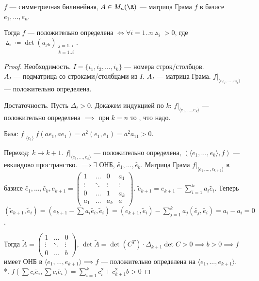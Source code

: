   \begin{theorem}
    $f$ --- симметричная билинейная,  $A \in M_n(\R)$ --- матрица Грама  $f$  в базисе $e_1, \ldots, e_n$.

    Тогда $f$ --- положительно определена  $\iff \forall i = 1..n \vartriangle_i > 0$, где $\vartriangle_i \coloneqq \det(a_{jk})_{\substack{j=1..i\\k=1..i}}$.
\end{theorem}
\begin{proof}
    Необходимость. $I = \{i_1, i_2, \ldots, i_k\}$ --- номера строк/столбцов.
\\
    $A_I$ --- подматрица со строками/столбцами из  $I$.  $A_I$ --- матрица Грама.  $f\Big|_{\langle e_{i_1}, \ldots, e_{i_k} \rangle}$ --- положительно определена.

    Достаточность. Пусть $\Delta_i > 0$. Докажем индукцией по $k$:  $f\Big|_{\langle e_1, \ldots, e_k\rangle}$ ---  положительно определена $\implies$ при  $k = n$ то , что надо.

    База:  $f \Big|_{\langle e_1 \rangle}\ f(ae_1, ae_1) = a^2(e_1, e_1) = a^2a_{11} > 0$.

    Переход: $k \to k + 1$.  $f\Big|_{\langle e_1, \ldots, e_k \rangle}$ --- положительно определена, $(\langle e_1, \ldots, e_k \rangle, f)$ --- евклидово пространство. $\implies \exists$ ОНБ, $\widetilde{e_1}, \ldots, \widetilde{e_k}$. Матрица Грама $f \Big|_{\langle e_1, \ldots, e_{k+1} \rangle}$ в базисе $\widetilde{e_1}, \ldots, \widetilde{e_k}, e_{k+1} =
    \left(\begin{array}{ccc|c}
    1 & \ldots & 0 & a_1\\
    \vdots & \ddots & \vdots & \vdots\\
    0 & \ldots & 1 & a_k\\ \hline
    a_1 & \ldots & a_k & a
\end{array}\right)$. 
$\widetilde{e}_{k+1} = e_{k+1} - \sum\limits_{i=1}^k a_i\widetilde{e_i}$. Теперь $(\widetilde{e}_{k+1}, \widetilde{e}_i) = (e_{k+1} - \sum a_i \widetilde{e_i}, \widetilde{e}_i) = (e_{k+1}, \widetilde{e}_i) - \sum\limits_{j=1}^k a_j(\widetilde{e_j}, \widetilde{e_i}) = a_i - a_i = 0$.

Тогда $\widetilde{A} = 
\begin{pmatrix}
    1 & \ldots & 0\\
    \vdots & \ddots & \vdots\\
    0 & \ldots & b
\end{pmatrix}$, $\det \widetilde{A} = \det (C^T) \cdot \Delta_{k+1} \det C > 0 \implies b > 0 \implies f$ имеет ОНБ в $\langle e_1, \ldots, e_{k+1} \rangle \implies f$ --- положительно определена на $\langle e_1, \ldots, e_{k+1} \rangle$.\\
*. $f(\sum c_i \widetilde{e_i}, \sum c_i \widetilde{e_i}) = \sum_{i=1}^k c_i^2 + c_{k+1}^{2}b > 0$
\end{proof}
